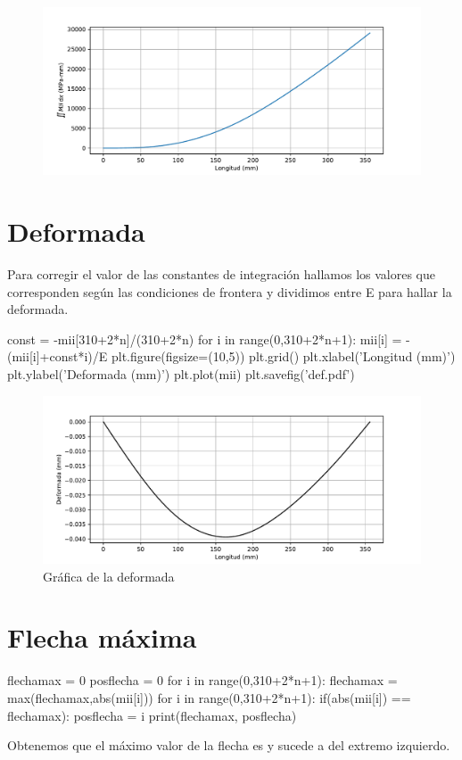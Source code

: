 \documentclass[a4paper,11pt]{report}
\begin{document}
\begin{figure}[H]
\centering
\includegraphics[scale=0.72]{m2i.pdf}
\end{figure}
\chapter{Deformada}
Para corregir el valor de las constantes de integración hallamos los valores que corresponden según las condiciones de frontera y dividimos entre E para hallar la deformada.
\begin{pyglist}[language=python,caption={Deformada},style=tango]
const = -mii[310+2*n]/(310+2*n)
for i in range(0,310+2*n+1):
    mii[i] = -(mii[i]+const*i)/E
plt.figure(figsize=(10,5))
plt.grid()
plt.xlabel('Longitud (mm)')
plt.ylabel('Deformada (mm)')
plt.plot(mii)
plt.savefig('def.pdf')
\end{pyglist}
\begin{figure}[H]
\centering
\includegraphics[scale=0.72]{def.pdf}
\caption{Gráfica de la deformada}
\end{figure}
\chapter{Flecha máxima}
\begin{pyglist}[language=python,caption={Cálculo de la flecha},style=tango]
flechamax = 0
posflecha = 0
for i in range(0,310+2*n+1):
    flechamax = max(flechamax,abs(mii[i]))
for i in range(0,310+2*n+1):
    if(abs(mii[i]) == flechamax):
        posflecha = i
print(flechamax, posflecha)
\end{pyglist}
Obtenemos que el máximo valor de la flecha es  y sucede a  del extremo izquierdo.
\end{document}
